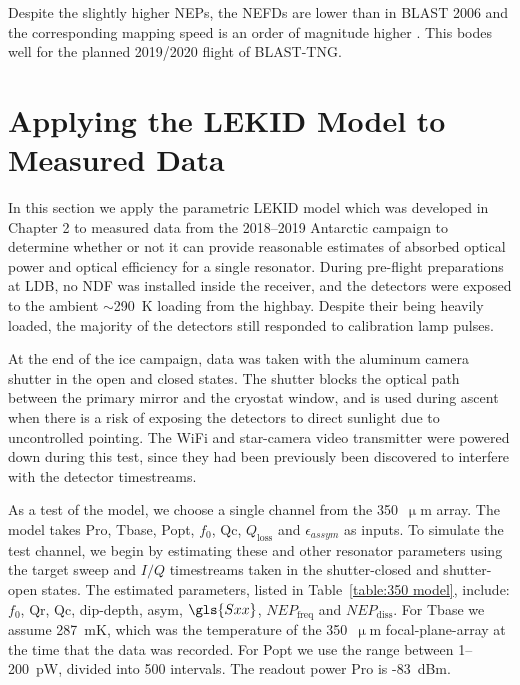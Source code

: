 Despite the slightly higher NEPs, the NEFDs are lower than in BLAST 2006 and the corresponding mapping speed is an order of magnitude higher \citep{marsden2009blast}. This bodes well for the planned 2019/2020 flight of BLAST-TNG\@.

\section{Applying the LEKID Model to Measured Data}\label{applying model}

In this section we apply the parametric LEKID model which was developed in Chapter 2 to measured data from the 2018--2019 Antarctic campaign to determine whether or not it can provide reasonable estimates of absorbed optical power and optical efficiency for a single resonator. During pre-flight preparations at LDB, no NDF was installed inside the receiver, and the detectors were exposed to the ambient $\sim$290~K loading from the highbay. Despite their being heavily loaded, the majority of the detectors still responded to calibration lamp pulses.

At the end of the ice campaign, data was taken with the aluminum camera shutter in the open and closed states. The shutter blocks the optical path between the primary mirror and the cryostat window, and is used during ascent when there is a risk of exposing the detectors to direct sunlight due to uncontrolled pointing. The WiFi and star-camera video transmitter were powered down during this test, since they had been previously been discovered to interfere with the detector timestreams.

As a test of the model, we choose a single channel from the 350~$\upmu$m array. The model takes \gls{Pro}, \gls{Tbase}, \gls{Popt}, $f_{0}$, \gls{Qc}, $Q_{\mathrm{loss}}$ and $\epsilon_{assym}$ as inputs. To simulate the test channel, we begin by estimating these and other resonator parameters using the target sweep and $I/Q$ timestreams taken in the shutter-closed and shutter-open states. The estimated parameters, listed in Table~\ref{table:350 model}, include: $f_{0}$, \gls{Qr}, \gls{Qc}, dip-depth, \gls{asym}, $\gls{Sxx}$, $NEP_{\mathrm{freq}}$ and $NEP_{\mathrm{diss}}$. For \gls{Tbase} we assume 287~mK, which was the temperature of the 350~$\upmu$m focal-plane-array at the time that the data was recorded. For \gls{Popt} we use the range between 1--200~pW, divided into 500 intervals. The readout power \gls{Pro} is -83~dBm.

